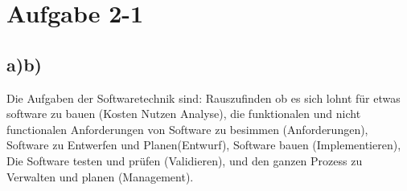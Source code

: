 \chapter{Aufgabe 2-1}
\section{a)\-b)}
 Die Aufgaben der Softwaretechnik sind: Rauszufinden ob es sich lohnt für etwas software zu bauen (Kosten Nutzen Analyse), die funktionalen und nicht functionalen Anforderungen von Software zu besimmen (Anforderungen), Software zu Entwerfen und Planen(Entwurf), Software bauen (Implementieren), Die Software testen und prüfen (Validieren), und den ganzen Prozess zu Verwalten und planen (Management).